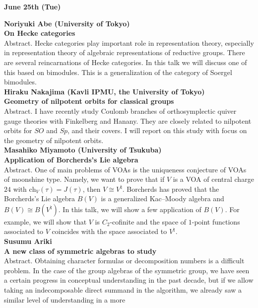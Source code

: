 \documentclass[12pt,landscape]{jarticle}
\begin{document}

\begin{center}
{\bf\Large June 25th (Tue)}
\end{center}

\noindent
{\bf\large Noriyuki Abe (University of Tokyo)} \\
{\bf On Hecke categories} \\[1mm]
Abstract. 
Hecke categories play important role in representation theory, especially in representation theory of algebraic representations of reductive groups. There are several reincarnations of Hecke categories. In this talk we will discuss one of this based on bimodules. This is a generalization of the category of Soergel bimodules.
\\[5mm]
{\bf\large Hiraku Nakajima (Kavli IPMU, the University of Tokyo)} \\
{\bf Geometry of nilpotent orbits for classical groups} \\[1mm]
Abstract. 
I have recently study Coulomb branches of orthosymplectic quiver gauge theories with Finkelberg and Hanany. They are closely related to nilpotent orbits for $SO$ and $Sp$, and their covers. I will report on this study with focus on the geometry of nilpotent orbits.
\\[5mm]
{\bf\large Masahiko Miyamoto (University of Tsukuba)} \\
{\bf Application of Borcherds's Lie algebra} \\[1mm]
Abstract. 
One of main problems of VOAs is the uniqueness conjecture of VOAs of moonshine type. 
Namely, we want to prove that if $V$ is a VOA of central charge $24$ with $\mathrm{ch}_V(\tau)=J(\tau)$, then $V \cong V^{\natural}$. 
Borcherds has proved that the Borcherds's Lie algebra $B(V)$ is a generalized Kac--Moody algebra and $B(V) \cong B(V^{\natural})$. 
In this talk, we will show a few application of $B(V)$. 
For example, we will show that $V$ is $C_2$-cofinite and the space of $1$-point functions associated to $V$ coincides with the space associated to $V^{\natural}$. 
\\[5mm]
{\bf\large Susumu Ariki} \\
{\bf A new class of symmetric algebras to study} \\[1mm]
Abstract. 
Obtaining character formulas or decomposition numbers is a difficult problem. In the case of the group algebras of the symmetric group, we have seen a certain progress in conceptual understanding in the past decade, but if we allow taking an indecomposable direct summand in the algorithm, we already saw a similar level of understanding in a more 
\end{document}
